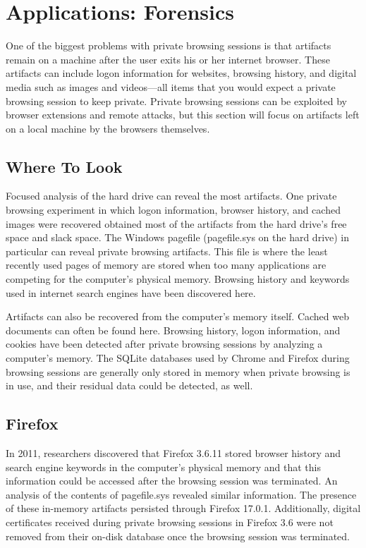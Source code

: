 \documentclass[pdftex,letterpaper,titlepage,12pt]{article}
\begin{document}
  \section{Applications: Forensics}
  One of the biggest problems with private browsing sessions is that artifacts
  remain on a machine after the user exits his or her internet browser. These
  artifacts can include logon information for websites, browsing history,
  and digital media such as images and videos---all items that you would expect
  a private browsing session to keep private.\cite{ohana13} Private browsing
  sessions can be exploited by browser extensions and remote attacks, but this 
  section will focus on artifacts left on a local machine by the browsers 
  themselves.

    \subsection{Where To Look}
    Focused analysis of the hard drive can reveal the most artifacts.
    One private browsing experiment in which logon information, browser
    history, and cached images were recovered obtained most of the artifacts
    from the hard drive's free space and slack space.\cite{ohana13} The 
    Windows pagefile (pagefile.sys on the hard drive) in particular can reveal
    private browsing artifacts. This file is where the least recently used 
    pages of memory are stored when too many applications are competing for the
    computer's physical memory. Browsing history and keywords used in internet 
    search engines have been discovered here.\cite{said11}

    Artifacts can also be recovered from the computer's memory itself. Cached
    web documents can often be found here.\cite{ohana13} Browsing history,
    logon information, and cookies have been detected after private browsing
    sessions by analyzing a computer's memory. The SQLite databases used by 
    Chrome and Firefox during browsing sessions are generally only stored in 
    memory when private browsing is in use, and their residual data could be 
    detected, as well.\cite{satvat13}

    \subsection{Firefox}
    In 2011, researchers discovered that Firefox 3.6.11 stored browser history
    and search engine keywords in the computer's physical memory and that this
    information could be accessed after the browsing session was terminated.
    An analysis of the contents of pagefile.sys revealed similar information.
    \cite{said11} The presence of these in-memory artifacts persisted through 
    Firefox 17.0.1.\cite{ohana13} Additionally, digital certificates received 
    during private browsing sessions in Firefox 3.6 were not removed from their 
    on-disk database once the browsing session was terminated.\cite{aggarwal10}
    
\end{document}
